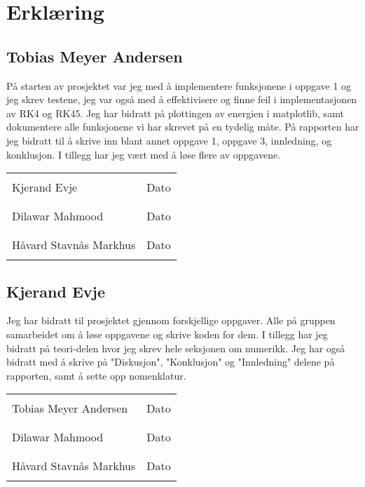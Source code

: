 \section{Erklæring}
\subsection{Tobias Meyer Andersen}
På starten av prosjektet var jeg med å implementere funksjonene i oppgave 1 og jeg skrev testene, jeg var også med å effektivisere og finne feil i implementasjonen av RK4 og RK45. Jeg har bidratt på plottingen av energien i matplotlib, samt dokumentere alle funksjonene vi har skrevet på en tydelig måte. På rapporten har jeg bidratt til å skrive  inn blant annet oppgave 1, oppgave 3, innledning, og konklusjon. I tillegg har jeg vært med å løse flere av oppgavene.
\vspace*{\fill}

\noindent\begin{tabular}{@{}p{2.5in}p{2.5in}@{}}
\dotfill                         & \dotfill\\
Kjerand Evje              & Dato\\
                                 & \\[8ex]
\dotfill                         & \dotfill\\
Dilawar Mahmood              & Dato\\
                                 & \\[8ex]
\dotfill                         & \dotfill\\
Håvard Stavnås Markhus              & Dato\\
                                 & \\[8ex]
\end{tabular}
\newpage
\subsection{Kjerand Evje}
Jeg har bidratt til prosjektet gjennom forskjellige oppgaver. Alle på gruppen samarbeidet om å løse oppgavene og skrive koden for dem. I tillegg har jeg bidratt på teori-delen hvor jeg skrev hele seksjonen om numerikk. Jeg har også bidratt med å skrive på "Diskusjon", "Konklusjon" og "Innledning" delene på rapporten, samt å sette opp nomenklatur.
\vspace*{\fill}

\noindent\begin{tabular}{@{}p{2.5in}p{2.5in}@{}}
\dotfill                         & \dotfill\\
Tobias Meyer Andersen              & Dato\\
                                 & \\[8ex]
\dotfill                         & \dotfill\\
Dilawar Mahmood              & Dato\\
                                 & \\[8ex]
\dotfill                         & \dotfill\\
Håvard Stavnås Markhus              & Dato\\
                                 & \\[8ex]
\end{tabular}
\newpage
